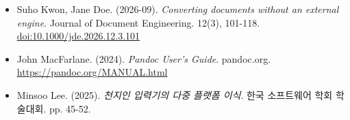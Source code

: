\documentclass[11pt]{article}
\date{}
\begin{document}
\begin{itemize}
\item Suho Kwon, Jane Doe. (2026-09). \emph{Converting documents without an
external engine}. Journal of Document Engineering. 12(3), 101-118.
\href{https://doi.org/10.1000/jde.2026.12.3.101}{doi:10.1000/jde.2026.12.3.101}
\item John MacFarlane. (2024). \emph{Pandoc User's Guide}. pandoc.org.
\url{https://pandoc.org/MANUAL.html}
\item Minsoo Lee. (2025). \emph{천지인 입력기의 다중 플랫폼 이식}. 한국 소프트웨어 학회 학술대회. pp.
45-52.
\end{itemize}
\end{document}
